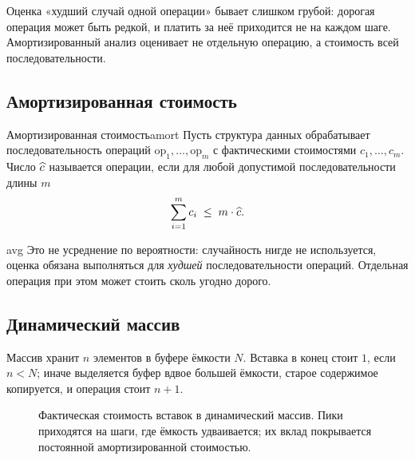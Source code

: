 \documentclass[../main.tex]{subfiles}
\begin{document}
\ifSubfilesClassLoaded{\standalonehead}{}


Оценка «худший случай одной операции» бывает слишком грубой: дорогая операция может
быть редкой, и платить за неё приходится не на каждом шаге. Амортизированный анализ
оценивает не отдельную операцию, а стоимость всей последовательности.

\subsection{Амортизированная стоимость}

\begin{Definition}{Амортизированная стоимость}{amort}
  Пусть структура данных обрабатывает последовательность операций
  $\mathrm{op}_1,\dots,\mathrm{op}_m$ с фактическими стоимостями $c_1,\dots,c_m$.
  Число $\widehat{c}$ называется  операции, если
  для любой допустимой последовательности длины $m$
  \[
    \sum_{i=1}^{m} c_i \;\le\; m\cdot\widehat{c} .
  \]
\end{Definition}

\begin{Remark}{}{avg}
  Это не усреднение по вероятности: случайность нигде не используется, оценка
  обязана выполняться для \emph{худшей} последовательности операций. Отдельная
  операция при этом может стоить сколь угодно дорого.
\end{Remark}

\subsection{Динамический массив}

Массив хранит $n$ элементов в буфере ёмкости $N$. Вставка в конец стоит $1$, если
$n < N$; иначе выделяется буфер вдвое большей ёмкости, старое содержимое
копируется, и операция стоит $n+1$.

\begin{figure}[H]
  \centering
  \caption{Фактическая стоимость вставок в динамический массив. Пики приходятся на
    шаги, где ёмкость удваивается; их вклад покрывается постоянной амортизированной
    стоимостью.}
  \label{fig:pushback}
\end{figure}
\end{document}
